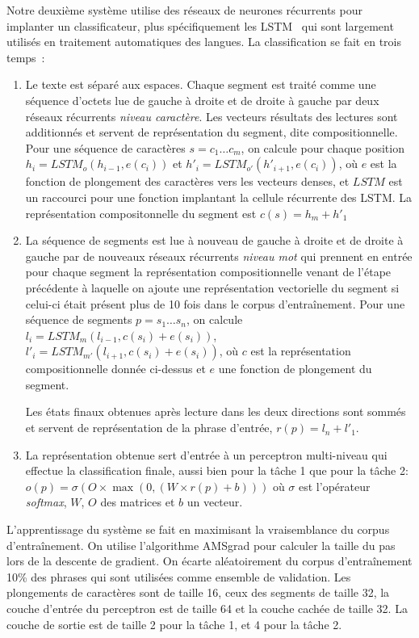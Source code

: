 Notre deuxième système utilise des réseaux de neurones récurrents pour implanter un classificateur, plus spécifiquement les LSTM~\cite{hochreiter1997long} qui sont largement utilisés en traitement automatiques des langues.
La classification se fait en trois temps~:
\begin{enumerate}
\item Le texte est séparé aux espaces.
  Chaque segment est traité comme une séquence d'octets lue de gauche à droite et de droite à gauche par deux réseaux récurrents \emph{niveau caractère}.
  Les vecteurs résultats des lectures sont additionnés et servent de représentation du segment, dite compositionnelle.
  Pour une séquence de caractères $s = c_{1}\ldots c_{m}$, on calcule pour chaque position $h_{i} = LSTM_{o}(h_{i-1},e(c_{i}))$ et $h'_{i} = LSTM_{o'}(h'_{i+1},e(c_{i}))$, où $e$ est la fonction de plongement des caractères vers les vecteurs denses, et $LSTM$ est un raccourci pour une fonction  implantant la cellule récurrente des LSTM.
  La représentation compositonnelle du segment est $c(s) = h_{m} + h'_{1}$

\item La séquence de segments est lue à nouveau de gauche à droite et de droite à gauche par de nouveaux réseaux récurrents \emph{niveau mot} qui prennent en entrée pour chaque segment la représentation compositionnelle venant de l'étape précédente à laquelle on ajoute une représentation vectorielle du segment si celui-ci était présent  plus de 10 fois dans le corpus d'entraînement.
  Pour une séquence de segments $p = s_{1} \ldots s_{n}$, on calcule
  $l_{i} = LSTM_{m}(l_{i-1},c(s_{i}) + e(s_{i}))$, $l'_{i} =
  LSTM_{m'}(l_{i+1},c(s_{i}) + e(s_{i}))$, où $c$ est la représentation compositionnelle donnée ci-dessus et $e$ une fonction de plongement du segment.

  Les états finaux obtenues après lecture dans les deux directions sont sommés et servent de représentation de la phrase d'entrée, $r(p) = l_{n} + l'_{1}$.

\item La représentation obtenue sert d'entrée à un perceptron multi-niveau qui effectue la classification finale, aussi bien pour la tâche 1 que pour la tâche 2:  $o(p) = \sigma(O \times \max(0, (W \times r(p) + b)))$ où $\sigma$ est l'opérateur \emph{softmax}, $W$, $O$ des matrices et $b$ un vecteur.
\end{enumerate}

L'apprentissage du système se fait en maximisant la vraisemblance du corpus d'entraînement.
On utilise l'algorithme AMSgrad pour  calculer la taille du pas lors de la descente de gradient.
On écarte aléatoirement du corpus d'entraînement 10\% des phrases qui sont utilisées comme ensemble de validation.
Les plongements de caractères sont de taille 16, ceux des segments de taille 32, la couche d'entrée du perceptron est de taille 64 et la couche cachée de taille 32.
La couche de sortie est de taille 2 pour la tâche 1, et 4 pour la tâche 2.

